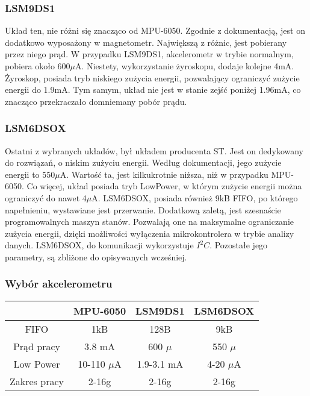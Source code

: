 \subsubsection{LSM9DS1}
Układ ten, nie różni się znacząco od MPU-6050. Zgodnie z dokumentacją, jest on dodatkowo wyposażony w magnetometr. Największą z różnic, jest pobierany przez niego prąd. W przypadku LSM9DS1, akcelerometr w trybie normalnym, pobiera około 600$\mu$A.\cite{LSM9DS1} Niestety, wykorzystanie żyroskopu, dodaje kolejne 4mA. Żyroskop, posiada tryb niskiego zużycia energii, pozwalający ograniczyć zużycie energii do 1.9mA. Tym samym, układ nie jest w stanie zejść poniżej 1.96mA, co znacząco przekraczało domniemany pobór prądu.

\subsubsection{LSM6DSOX}
Ostatni z wybranych układów, był układem producenta ST. Jest on dedykowany do rozwiązań, o niskim zużyciu energii. Według dokumentacji, jego zużycie energii to 550$\mu$A.\cite{LSM6DSOX} Wartość ta, jest kilkukrotnie niższa, niż w przypadku MPU-6050. Co więcej, układ posiada tryb LowPower, w którym zużycie energii można ograniczyć do nawet 4$\mu$A. LSM6DSOX, posiada również 9kB FIFO, po którego napełnieniu, wystawiane jest przerwanie. Dodatkową zaletą, jest szesnaście programowalnych maszyn stanów. Pozwalają one na maksymalne ograniczanie zużycia energii, dzięki możliwości wyłączenia mikrokontrolera w trybie analizy danych. LSM6DSOX, do komunikacji wykorzystuje $I^{2}C$. Pozostałe jego parametry, są zbliżone do opisywanych wcześniej.

\subsubsection{Wybór akcelerometru}
\begin{center}
\begin{tabular}{|c | c | c | c|}
    \hline
     & MPU-6050 & LSM9DS1 & LSM6DSOX \\
    \hline
    FIFO & 1kB  &   128B  & 9kB \\
    \hline
    Prąd pracy  & 3.8 mA & 600 $\mu$ & 550 $\mu$ \\
    \hline
    Low Power & 10-110 $\mu$A & 1.9-3.1 mA & 4-20 $\mu$A\\
    \hline
    Zakres pracy & 2-16g & 2-16g & 2-16g\\
    \hline
\end{tabular}
\end{center}

